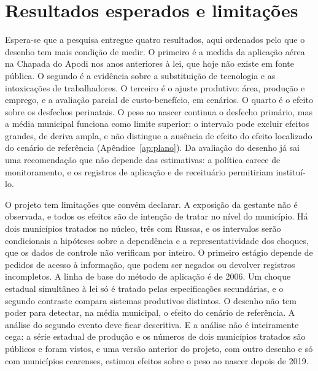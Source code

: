 \chapter{Resultados esperados e limitações}
\label{sec:conclusao}

Espera-se que a pesquisa entregue quatro resultados, aqui ordenados pelo que o
desenho tem mais condição de medir. O primeiro é a medida da aplicação aérea
na Chapada do Apodi nos anos anteriores à lei, que hoje não existe em fonte
pública. O segundo é a evidência sobre a substituição de tecnologia e as
intoxicações de trabalhadores. O terceiro é o ajuste produtivo: área,
produção e emprego, e a avaliação parcial de custo-benefício, em cenários. O
quarto é o efeito sobre os desfechos perinatais. O peso ao nascer continua o
desfecho primário, mas a média municipal funciona como limite superior: o
intervalo pode excluir efeitos grandes, de deriva ampla, e não distingue a
ausência de efeito do efeito localizado do cenário de referência
(Apêndice~\ref{ap:plano}). Da avaliação do desenho já sai uma recomendação que
não depende das estimativas: a política carece de monitoramento, e os
registros de aplicação e de receituário permitiriam instituí-lo.

O projeto tem limitações que convém declarar. A exposição da gestante não é
observada, e todos os efeitos são de intenção de tratar no nível do município.
Há dois municípios tratados no núcleo, três com Russas, e os intervalos serão condicionais a hipóteses sobre a dependência e a
representatividade dos choques, que os dados de controle não verificam por
inteiro. O primeiro estágio depende de pedidos de acesso à
informação, que podem ser negados ou devolver registros incompletos. A linha de
base do método de aplicação é de 2006. Um choque estadual simultâneo à lei só é
tratado pelas especificações secundárias, e o segundo contraste compara
sistemas produtivos distintos. O desenho não tem poder para detectar, na
média municipal, o efeito do cenário de referência. A análise do segundo
evento deve ficar descritiva. E a análise não é inteiramente cega: a
série estadual de produção e os números de dois municípios tratados são
públicos e foram vistos, e uma versão anterior do projeto, com outro desenho e
só com municípios cearenses, estimou efeitos sobre o peso ao nascer depois de
2019.
